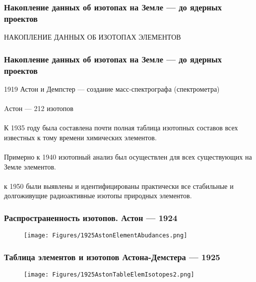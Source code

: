 \begin{frame}
\frametitle{Накопление данных об изотопах на Земле --- до ядерных проектов}

\begin{center}
НАКОПЛЕНИЕ ДАННЫХ ОБ ИЗОТОПАХ ЭЛЕМЕНТОВ	
\end{center}


\end{frame}


\begin{frame}
	\frametitle{Накопление данных об изотопах на Земле --- до ядерных проектов}
1919 Астон и Демпстер --- создание масс-спектрографа (спектрометра) \\
~\\
Aстон --- 212 изотопов\\
~\\
К 1935 году была составлена почти полная таблица изотопных составов всех известных
к тому времени химических элементов.\\
~\\
Примерно к 1940 изотопный анализ был осуществлен для всех существующих на Земле элементов. \\
~\\
к 1950 были выявлены и
идентифицированы практически все стабильные и долгоживущие радиоактивные изотопы природных
элементов. 

\end{frame}

\begin{frame}
	\frametitle{Распространенность изотопов. Астон --- 1924}
	
	\begin{figure}[ht] 
		\centering\small
		\unitlength=1mm
		\texttt{[image: Figures/1925AstonElementAbudances.png]} 
		\label{f:Aston1925Ab}
	\end{figure}	
	
\end{frame}


\begin{frame}
\frametitle{Таблица элементов и изотопов Астона-Демстера --- 1925}

\begin{figure}[ht] 
	\centering\small
	\unitlength=1mm
	\texttt{[image: Figures/1925AstonTableElemIsotopes2.png]} 
	\label{f:Aston1925}
\end{figure}	

\end{frame}




